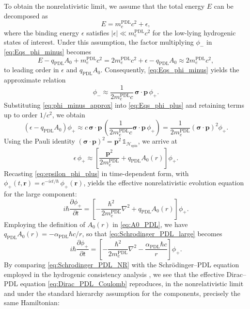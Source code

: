 \documentclass[11pt,a4paper]{article}
\theoremstyle{definition}
\newcommand{\PDL}{\mathrm{PDL}}
\newcommand{\Hspin}{\mathcal{H}_{\mathrm{spin}}}
\newcommand{\alphaPDL}{\alpha_{\mathrm{PDL}}}
\begin{document}
To obtain the nonrelativistic limit, we assume that the total energy \(E\) can be decomposed as
\[
E = m_e^{\PDL} c^2 + \epsilon,
\]
where the binding energy \(\epsilon\) satisfies \(|\epsilon|\ll m_e^{\PDL} c^2\) for the low-lying hydrogenic states of interest. Under this assumption, the factor multiplying \(\phi_{-}\) in \eqref{eq:Eqs_phi_minus} becomes
\[
E - q_{\PDL} A_0 + m_e^{\PDL} c^2 = 2 m_e^{\PDL} c^2 + \epsilon - q_{\PDL} A_0 \approx 2 m_e^{\PDL} c^2,
\]
to leading order in \(\epsilon\) and \(q_{\PDL} A_0\). Consequently, \eqref{eq:Eqs_phi_minus} yields the approximate relation
\begin{equation}
\phi_{-} \approx \frac{1}{2 m_e^{\PDL} c}\,\boldsymbol{\sigma}\cdot\mathbf{p}\,\phi_{+}.
\label{eq:phi_minus_approx}
\end{equation}
Substituting \eqref{eq:phi_minus_approx} into \eqref{eq:Eqs_phi_plus} and retaining terms up to order \(1/c^2\), we obtain
\[
\left(\epsilon - q_{\PDL} A_0\right)\phi_{+} \approx c\,\boldsymbol{\sigma}\cdot\mathbf{p}\,\left(\frac{1}{2 m_e^{\PDL} c} \boldsymbol{\sigma}\cdot\mathbf{p}\,\phi_{+}\right) = \frac{1}{2 m_e^{\PDL}} \left(\boldsymbol{\sigma}\cdot\mathbf{p}\right)^2 \phi_{+}.
\]
Using the Pauli identity \((\boldsymbol{\sigma}\cdot\mathbf{p})^2 = \mathbf{p}^2\,\mathbb{1}_{\Hspin}\), we arrive at
\begin{equation}
\epsilon\,\phi_{+} \approx \left[\frac{\mathbf{p}^2}{2 m_e^{\PDL}} + q_{\PDL} A_0(r)\right]\phi_{+}.
\label{eq:epsilon_phi_plus}
\end{equation}
Recasting \eqref{eq:epsilon_phi_plus} in time-dependent form, with \(\phi_{+}(t,\mathbf{r}) = e^{-i \epsilon t/\hbar}\,\phi_{+}(\mathbf{r})\), yields the effective nonrelativistic evolution equation for the large component:
\begin{equation}
i\hbar \frac{\partial \phi_{+}}{\partial t} = \left[-\frac{\hbar^2}{2 m_e^{\PDL}} \nabla^2 + q_{\PDL} A_0(r)\right]\phi_{+}.
\label{eq:Schrodinger_PDL_large}
\end{equation}
Employing the definition of \(A_0(r)\) in \eqref{eq:A0_PDL}, we have \(q_{\PDL} A_0(r) = -\alphaPDL \hbar c / r\), so that \eqref{eq:Schrodinger_PDL_large} becomes
\begin{equation}
i\hbar \frac{\partial \phi_{+}}{\partial t} = \left[-\frac{\hbar^2}{2 m_e^{\PDL}} \nabla^2 - \frac{\alphaPDL \hbar c}{r}\right]\phi_{+}.
\label{eq:Schrodinger_PDL_NR}
\end{equation}
By comparing \eqref{eq:Schrodinger_PDL_NR} with the Schr\"odinger–PDL equation employed in the hydrogenic consistency analysis \cite{Schodinger_PDL,Sketch_derivation_Schroedinger_PDL}, we see that the effective Dirac–PDL equation \eqref{eq:Dirac_PDL_Coulomb} reproduces, in the nonrelativistic limit and under the standard hierarchy assumption for the components, precisely the same Hamiltonian:
\end{document}
